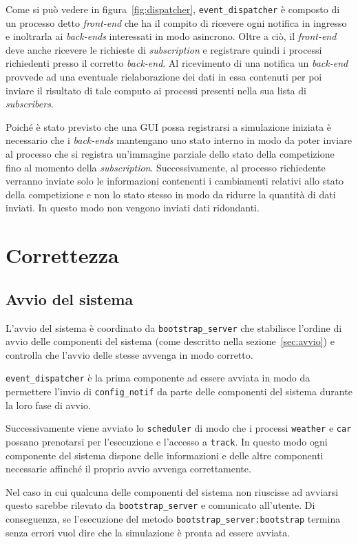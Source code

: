 \documentclass[a4paper]{report}
\newcommand{\fun}[1]{\texttt{#1}}
\begin{document}
Come si può vedere in figura~\ref{fig:dispatcher}, \texttt{event\_dispatcher} è composto di un processo detto \textit{front-end} che ha il compito di ricevere ogni notifica in ingresso e inoltrarla ai \textit{back-ends} interessati in modo asincrono. Oltre a ciò, il \textit{front-end} deve anche ricevere le richieste di \textit{subscription} e registrare quindi i processi richiedenti presso il corretto \textit{back-end}. Al ricevimento di una notifica un \textit{back-end} provvede ad una eventuale rielaborazione dei dati in essa contenuti per poi inviare il risultato di tale computo ai processi presenti nella sua lista di \textit{subscribers}.

Poiché è stato previsto che una GUI possa registrarsi a simulazione iniziata è necessario che i \textit{back-ends} mantengano uno stato interno in modo da poter inviare al processo che si registra un'immagine parziale dello stato della competizione fino al momento della \textit{subscription}. Successivamente, al processo richiedente verranno inviate solo le informazioni contenenti i cambiamenti relativi allo stato della competizione e non lo stato stesso in modo da ridurre la quantità di dati inviati. In questo modo non vengono inviati dati ridondanti.


\chapter{Correttezza}
\section{Avvio del sistema}
L'avvio del sistema è coordinato da \texttt{bootstrap\_server} che stabilisce l'ordine di avvio delle componenti del sistema (come descritto nella sezione~\ref{sec:avvio}) e controlla che l'avvio delle stesse avvenga in modo corretto.

\texttt{event\_dispatcher} è la prima componente ad essere avviata in modo da permettere l'invio di \fun{config\_notif} da parte delle componenti del sistema durante la loro fase di avvio.

Successivamente viene avviato lo \texttt{scheduler} di modo che i processi \texttt{weather} e \texttt{car} possano prenotarsi per l'esecuzione e l'accesso a \texttt{track}. In questo modo ogni componente del sistema dispone delle informazioni e delle altre componenti necessarie affinché il proprio avvio avvenga correttamente.

Nel caso in cui qualcuna delle componenti del sistema non riuscisse ad avviarsi questo sarebbe rilevato da \texttt{bootstrap\_server} e comunicato all'utente. Di conseguenza, se l'esecuzione del metodo \fun{bootstrap\_server:bootstrap} termina senza errori vuol dire che la simulazione è pronta ad essere avviata.
\end{document}

